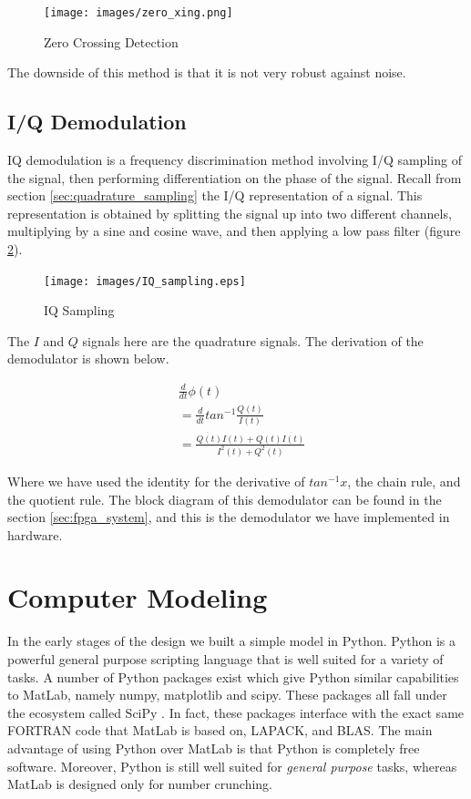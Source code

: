 \documentclass[a4paper, 12pt, notitlepage]{article}
\begin{document}
\begin{figure}
  \centering
  \caption{Zero Crossing Detection}
  \label{fig:zero_xing}
  \texttt{[image: images/zero\_xing.png]}
\end{figure}

The downside of this method is that it is not very robust against noise.  

\subsection{I/Q Demodulation}
IQ demodulation is a frequency discrimination method involving I/Q sampling of the signal, then performing differentiation on the phase of the signal.  Recall from section \ref{sec:quadrature_sampling} the I/Q representation of a signal.  This representation is obtained by splitting the signal up into two different channels, multiplying by a sine and cosine wave, and then applying a low pass filter (figure \ref{fig:iq_sampling}).

\begin{figure} [ht]
  \centering
  \caption{IQ Sampling}
  \label{fig:iq_sampling}
  \texttt{[image: images/IQ\_sampling.eps]}
\end{figure}

The $I$ and $Q$ signals here are the quadrature signals.  The derivation of the demodulator is shown below.

\begin{equation}
\begin{aligned}
  & \frac{d}{dt}\phi(t) \\
  & = \frac{d}{dt}tan^{-1}\frac{Q(t)}{I(t)} \\
  & = \frac{\dot{Q(t)}I(t) + Q(t)\dot{I(t)}}{I^2(t) + Q^2(t)}
\end{aligned}
\end{equation}

Where we have used the identity for the derivative of $tan^{-1} x$, the chain rule, and the quotient rule.  The block diagram of this demodulator can be found in the section \ref{sec:fpga_system}, and this is the demodulator we have implemented in hardware.

\section{Computer Modeling}
\label{sec:model}
In the early stages of the design we built a simple model in Python.  Python is a powerful general purpose scripting language that is well suited for a variety of tasks.  A number of Python packages exist which give Python similar capabilities to MatLab, namely numpy, matplotlib and scipy.  These packages all fall under the ecosystem called SciPy \cite{scipy}.  In fact, these packages interface with the exact same FORTRAN code that MatLab is based on, LAPACK\cite{lapack}, and BLAS\cite{blas}.  The main advantage of using Python over MatLab is that Python is completely free software.  Moreover, Python is still well suited for \textit{general purpose} tasks, whereas MatLab is designed only for number crunching.
\end{document}

